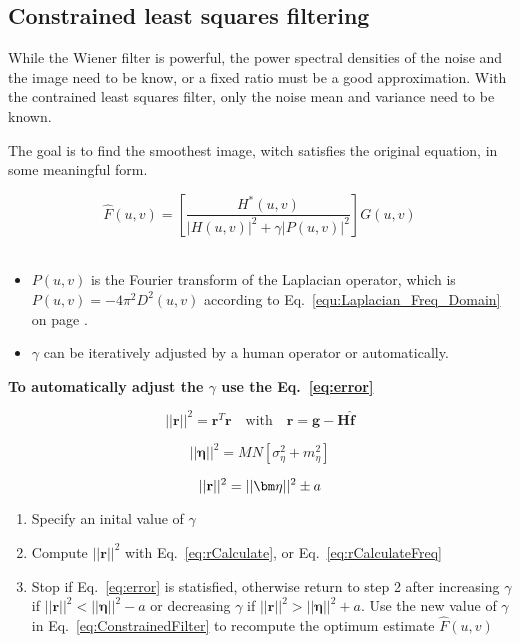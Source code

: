 \subsection{Constrained least squares filtering }
While the Wiener filter is powerful, the power spectral densities of the noise and the image need to be know, or a fixed ratio must be a good approximation. With the contrained least squares filter, only the noise mean and variance need to be known.

The goal is to find the smoothest image, witch satisfies the original equation, in some meaningful form.
 
\begin{equation}
	\hat{F}(u,v) = \left[ \frac{H^*(u,v)}{|H(u,v)|^2 + \gamma |P(u,v)|^2} \right] G(u,v)
	\label{eq:ConstrainedFilter}
\end{equation}\\

\begin{itemize}
	\item $P(u,v)$ is the Fourier transform of the Laplacian operator, which is $P(u,v) = -4\pi^2D^2(u,v)$ according to Eq.~\ref{equ:Laplacian_Freq_Domain} on page \pageref{equ:Laplacian_Freq_Domain}.
	\item $\gamma$ can be iteratively adjusted by a human operator or automatically.
\end{itemize}

\textbf{To automatically adjust the $\gamma$ use the Eq.~\ref{eq:error}}

\begin{equation}
	||\mathbf{r}||^{2} = \mathbf{r}^{T}\mathbf{r} \quad \textrm{with} \quad\mathbf{r} = \mathbf{g}-\mathbf{H} \mathbf{\hat{f}}	
	\label{eq:rCalculate}
\end{equation}

\begin{equation}
	||\bm\eta||^2= MN[\sigma_{\eta}^2 + m_{\eta}^2]	
\end{equation}

\begin{equation}
	||\mathbf{r}||^2 = ||\bm\eta||^2 \pm a
	\label{eq:error}\\
\end{equation}
\begin{enumerate}
	\item Specify an inital value of $\gamma$
	\item Compute $||\mathbf{r}||^2$ with Eq.~\ref{eq:rCalculate}, or  Eq.~\ref{eq:rCalculateFreq}
	\item Stop if Eq.~\ref{eq:error} is statisfied, otherwise return to step 2 after increasing $\gamma$ if $||\mathbf{r}||^2 < ||\bm\eta||^2-a$ or  decreasing $\gamma$ if  $||\mathbf{r}||^2 > ||\bm\eta||^2+a$. Use the new value of $\gamma$ in Eq.~\ref{eq:ConstrainedFilter} to recompute the optimum estimate $\hat{F}(u,v)$
\end{enumerate}

